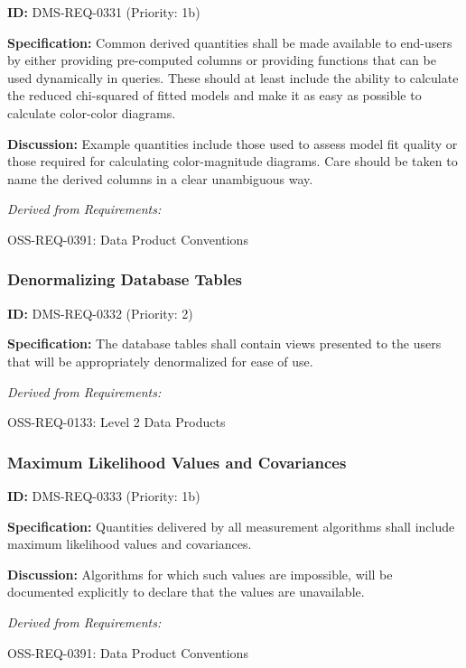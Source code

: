 \documentclass[SE,toc,lsstdraft]{lsstdoc}
\begin{document}
\label{DMS-REQ-0331}
\textbf{ID:} DMS-REQ-0331 (Priority: 1b)

\textbf{Specification:} Common derived quantities shall be made available to end-users by either providing pre-computed columns or providing functions that can be used dynamically in queries. These should at least include the ability to calculate the reduced chi-squared of fitted models and make it as easy as possible to calculate color-color diagrams.

\textbf{Discussion:} Example quantities include those used to assess model fit quality or those required for calculating color-magnitude diagrams. Care should be taken to name the derived columns in a clear unambiguous way.

\emph{Derived from Requirements:}

OSS-REQ-0391:
Data Product Conventions \newline

\subsubsection{Denormalizing Database Tables}

\label{DMS-REQ-0332}
\textbf{ID:} DMS-REQ-0332 (Priority: 2)

\textbf{Specification:} The database tables shall contain views presented to the users that will be appropriately denormalized for ease of use.

\emph{Derived from Requirements:}

OSS-REQ-0133:
Level 2 Data Products \newline

\subsubsection{Maximum Likelihood Values and Covariances}

\label{DMS-REQ-0333}
\textbf{ID:} DMS-REQ-0333 (Priority: 1b)

\textbf{Specification:} Quantities delivered by all measurement algorithms shall include maximum likelihood values and covariances.

\textbf{Discussion:} Algorithms for which such values are impossible, will be documented explicitly to declare that the values are unavailable.

\emph{Derived from Requirements:}

OSS-REQ-0391:
Data Product Conventions \newline
\end{document}
